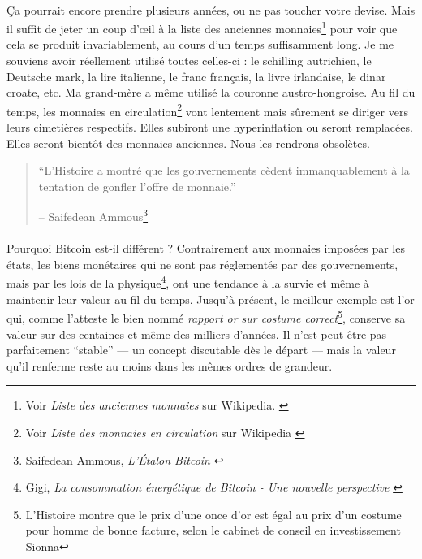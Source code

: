 \paragraph{}
Ça pourrait encore prendre plusieurs années, ou ne pas toucher votre devise.
Mais il suffit de jeter un coup d'œil à la liste des anciennes
monnaies\footnote{Voir \textit{Liste des anciennes monnaies} sur Wikipedia.
\cite{wiki:historical-currencies}} pour voir que cela se produit invariablement,
au cours d'un temps suffisamment long. Je me souviens avoir réellement utilisé
toutes celles-ci : le schilling autrichien, le Deutsche mark, la lire italienne,
le franc français, la livre irlandaise, le dinar croate, etc. Ma grand-mère a
même utilisé la couronne austro-hongroise. Au fil du temps, les monnaies en
circulation\footnote{Voir \textit{Liste des monnaies en circulation} sur
Wikipedia \cite{wiki:list-of-currencies}} vont lentement mais sûrement se
diriger vers leurs cimetières respectifs. Elles subiront une hyperinflation ou
seront remplacées. Elles seront bientôt des monnaies anciennes. Nous les
rendrons obsolètes.

\begin{quotation}\begin{samepage}
\enquote{L'Histoire a montré que les gouvernements cèdent immanquablement à la
tentation de gonfler l'offre de monnaie.}
\begin{flushright} -- Saifedean Ammous\footnote{Saifedean Ammous,
\textit{L'Étalon Bitcoin} \cite{bitcoin-standard}}
\end{flushright}\end{samepage}\end{quotation}

\paragraph{}
Pourquoi Bitcoin est-il différent ? Contrairement aux monnaies imposées par les
états, les biens monétaires qui ne sont pas réglementés par des gouvernements,
mais par les lois de la physique\footnote{Gigi, \textit{La consommation
énergétique de Bitcoin - Une nouvelle perspective} \cite{gigi:energy}}, ont une
tendance à la survie et même à maintenir leur valeur au fil du temps. Jusqu'à
présent, le meilleur exemple est l'or qui, comme l'atteste le bien nommé
\textit{rapport or sur costume correct}\footnote{L'Histoire montre que le prix
d'une once d'or est égal au prix d'un costume pour homme de bonne facture, selon
le cabinet de conseil en investissement
Sionna\cite{web:gold-to-decent-suite-ratio}}, conserve sa valeur sur des
centaines et même des milliers d'années. Il n'est peut-être pas parfaitement
\enquote{stable} --- un concept discutable dès le départ --- mais la valeur
qu'il renferme reste au moins dans les mêmes ordres de grandeur.

